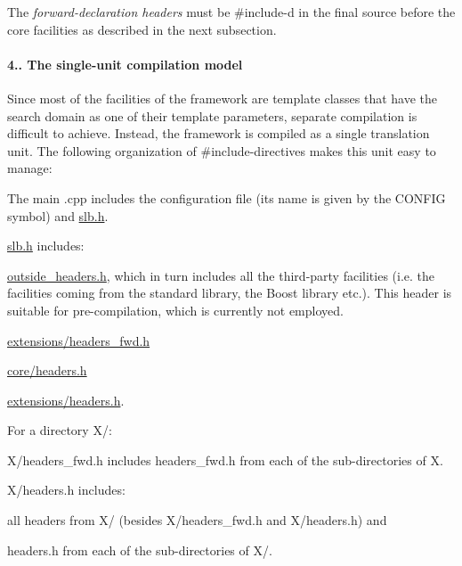 The {\itshape forward-\/declaration headers} must be {\ttfamily \#include}-\/d in the final source before the core facilities as described in the next subsection.\hypertarget{index_s-single-unit}{}\paragraph{4.. The single-\/unit compilation model}\label{index_s-single-unit}
Since most of the facilities of the framework are template classes that have the search domain as one of their template parameters, separate compilation is difficult to achieve. Instead, the framework is compiled as a single translation unit. The following organization of {\ttfamily \#include}-\/directives makes this unit easy to manage\+:
\begin{DoxyItemize}
\item The main {\ttfamily .cpp} includes the configuration file (its name is given by the {\ttfamily C\+O\+N\+F\+IG} symbol) and {\ttfamily \hyperlink{slb_8h}{slb.\+h}}.
\item {\ttfamily \hyperlink{slb_8h}{slb.\+h}} includes\+:
\begin{DoxyItemize}
\item {\ttfamily \hyperlink{outside__headers_8h}{outside\+\_\+headers.\+h}}, which in turn includes all the third-\/party facilities (i.\+e. the facilities coming from the standard library, the {\ttfamily Boost} library etc.). This header is suitable for pre-\/compilation, which is currently not employed.
\item {\ttfamily \hyperlink{headers__fwd_8h}{extensions/headers\+\_\+fwd.\+h}}
\item {\ttfamily \hyperlink{core_2headers_8h}{core/headers.\+h}}
\item {\ttfamily \hyperlink{extensions_2headers_8h}{extensions/headers.\+h}}.
\end{DoxyItemize}
\item For a directory {\ttfamily X/}\+:
\begin{DoxyItemize}
\item {\ttfamily X/headers\+\_\+fwd.\+h} includes {\ttfamily headers\+\_\+fwd.\+h} from each of the sub-\/directories of {\ttfamily X}.
\item {\ttfamily X/headers.\+h} includes\+:
\begin{DoxyItemize}
\item all headers from {\ttfamily X/} (besides {\ttfamily X/headers\+\_\+fwd.\+h} and {\ttfamily X/headers.\+h}) and
\item {\ttfamily headers.\+h} from each of the sub-\/directories of {\ttfamily X/}.
\end{DoxyItemize}
\end{DoxyItemize}
\end{DoxyItemize}


